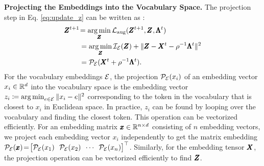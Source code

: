 \textbf{Projecting the Embeddings into the Vocabulary Space.} 
The projection step in Eq. \ref{eq:update_z} can be written as \cite{huang2021alternating}:
\begin{align}
    \pmb{Z}^{t+1} &\!= \operatorname*{arg\,min}_{\pmb{Z}} {\mathcal{L}}_\text{aug}(\pmb{Z}^{t+1}, \pmb{Z}^{}, \pmb{\Lambda}^t)\\
    & = \operatorname*{arg\,min}_{\pmb{Z}} {\mathcal{I}}_{\mathcal{E}}(\pmb{Z}) + \| \pmb{Z} - \pmb{X}^t - \rho^{-1}\pmb{\Lambda}^t\|^2\\
    & = {\mathcal{P}}_{\mathcal{E}}(\pmb{X}^t + \rho^{-1} \pmb{\Lambda}^t).
\end{align}
%
%
%
%
%
For the vocabulary embeddings ${\mathcal{E}}$, the projection ${\mathcal{P}}_{{\mathcal{E}}}({x}_i)$ of an embedding vector ${x}_i \in {\mathbb{R}}^d$ %
into the vocabulary space is the embedding vector ${z}_i \coloneqq \operatorname*{arg\,min}_{e \in {\mathcal{E}}} \|{x}_i - e\|^2$ corresponding to the token in the vocabulary that is closest to ${x}_i$ in Euclidean space. 
%
%
In practice, ${z}_i$ can be found by looping over the vocabulary and finding the closest token. This operation can be vectorized efficiently.
%
For an embedding matrix $\pmb{x} \in {\mathbb{R}}^{n \times d}$ consisting of $n$ embedding vectors, we project each embedding vector ${x}_i$ independently to get the matrix embedding $\gP_\gE(\vct{x}) \!=\! \begin{bmatrix}
\gP_\gE(x_1) \!&\! \gP_\gE(x_2) \!&\! \cdots \!&\! \gP_\gE(x_n)
\end{bmatrix}^\top$. Similarly, for the embedding tensor $\pmb{X}$, the projection operation can be vectorized efficiently to find $\pmb{Z}$. 

%

